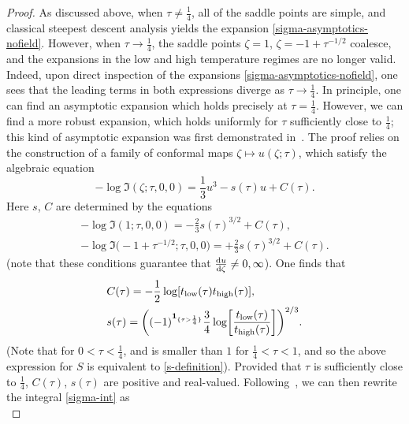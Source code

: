 \documentclass[pdftex]{sigma}
\numberwithin{equation}{section}
\begin{document}
\begin{proof}
 As discussed above, when $\tau\neq \frac{1}{4}$, all of the saddle points are simple, and classical steepest descent analysis
 yields the expansion \eqref{sigma-asymptotics-nofield}. However, when $\tau\to \frac{1}{4}$, the saddle points $\zeta = 1$,
 $\zeta = -1 + \tau^{-1/2}$ coalesce, and the expansions in the low and high temperature regimes are no longer valid. Indeed,
 upon direct inspection of the expansions \eqref{sigma-asymptotics-nofield}, one sees that the leading terms in
 both expressions diverge as $\tau\to \frac{1}{4}$. In principle, one can find an asymptotic expansion which holds precisely at
 $\tau = \frac{1}{4}$. However, we can find a more robust expansion, which holds uniformly for $\tau$ sufficiently close to
 $\frac{1}{4}$; this kind of asymptotic expansion was first demonstrated in~\cite{CFU}. The proof relies on the construction
 of a family of conformal maps $\zeta \mapsto u(\zeta;\tau)$, which satisfy the algebraic equation
 \begin{equation}\label{conformal-map-eq}
 -\log \mathfrak{I}(\zeta;\tau,0,0) = \frac{1}{3} u^3 -s(\tau) u + C(\tau).
 \end{equation}
 Here $s$, $C$ are determined by the equations
 \begin{gather*}
 -\log \mathfrak{I}(1;\tau,0,0) = -\frac{2}{3}s(\tau)^{3/2} + C(\tau),\\
 -\log \mathfrak{I}\bigl(-1+\tau^{-1/2};\tau,0,0\bigr) = + \frac{2}{3}s(\tau)^{3/2} + C(\tau).
 \end{gather*}
 \big(note that these conditions guarantee that $\frac{{\rm d}u}{{\rm d}\zeta}\neq 0,\infty$\big). One finds that
 \begin{align*}
 &C(\tau) = -\frac{1}{2}\log[t_{{\rm low}}(\tau)t_{{\rm high}}(\tau)],\\
 &s(\tau) = \biggl((-1)^{\mathbf{1}_{\{\tau>\frac{1}{4}\}}}\frac{3}{4}\log\biggl[\frac{t_{{\rm low}}(\tau)}{t_{{\rm high}}(\tau)}\biggr]\biggr)^{2/3}.
 \end{align*}
\big(Note that  for $0 < \tau < \frac{1}{4}$, and is smaller than $1$ for $\frac{1}{4} < \tau < 1$, and
so the above expression for $S$ is equivalent to \eqref{s-definition}\big). Provided that $\tau$ is sufficiently close to $\frac{1}{4}$, $C(\tau)$, $s(\tau)$ are positive and real-valued.
 Following~\cite{CFU}, we can then rewrite the integral \eqref{sigma-int} as
 \begin{equation*} %

\end{equation*}
\end{proof}
\end{document}
